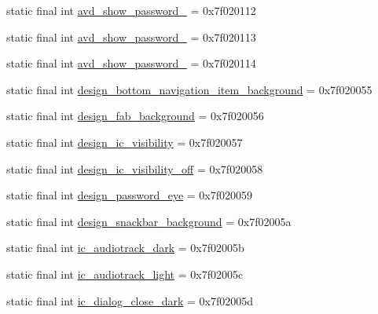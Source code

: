 \begin{CompactItemize}
\item 
static final int \hyperlink{classandroid_1_1support_1_1graphics_1_1drawable_1_1_r_1_1drawable_d4a29aeaf7ad557cc3f14b1596bc7652}{avd\_\-show\_\-password\_} = 0x7f020112
\item 
static final int \hyperlink{classandroid_1_1support_1_1graphics_1_1drawable_1_1_r_1_1drawable_0d20597e86bdadbb3573130cd3dee97e}{avd\_\-show\_\-password\_} = 0x7f020113
\item 
static final int \hyperlink{classandroid_1_1support_1_1graphics_1_1drawable_1_1_r_1_1drawable_2eb027e16dbe509fb7a4896f383d34ef}{avd\_\-show\_\-password\_} = 0x7f020114
\item 
static final int \hyperlink{classandroid_1_1support_1_1graphics_1_1drawable_1_1_r_1_1drawable_e15c27d54b049f78090d451ca2348e3a}{design\_\-bottom\_\-navigation\_\-item\_\-background} = 0x7f020055
\item 
static final int \hyperlink{classandroid_1_1support_1_1graphics_1_1drawable_1_1_r_1_1drawable_ea99f949fddb1cf339265057a4a5ef2c}{design\_\-fab\_\-background} = 0x7f020056
\item 
static final int \hyperlink{classandroid_1_1support_1_1graphics_1_1drawable_1_1_r_1_1drawable_ede647d858c86def0e6b942018263dd7}{design\_\-ic\_\-visibility} = 0x7f020057
\item 
static final int \hyperlink{classandroid_1_1support_1_1graphics_1_1drawable_1_1_r_1_1drawable_0a183279136f47d7c36b6ddb45dff171}{design\_\-ic\_\-visibility\_\-off} = 0x7f020058
\item 
static final int \hyperlink{classandroid_1_1support_1_1graphics_1_1drawable_1_1_r_1_1drawable_01623208452ba23558096606a51e0fa6}{design\_\-password\_\-eye} = 0x7f020059
\item 
static final int \hyperlink{classandroid_1_1support_1_1graphics_1_1drawable_1_1_r_1_1drawable_bc4f9fa0b74e1fc1dcbd5b5541974fe8}{design\_\-snackbar\_\-background} = 0x7f02005a
\item 
static final int \hyperlink{classandroid_1_1support_1_1graphics_1_1drawable_1_1_r_1_1drawable_e607e4c96c05dad67e7792f95d184d05}{ic\_\-audiotrack\_\-dark} = 0x7f02005b
\item 
static final int \hyperlink{classandroid_1_1support_1_1graphics_1_1drawable_1_1_r_1_1drawable_c07ec90c8ffd99807fe6835dacb41b35}{ic\_\-audiotrack\_\-light} = 0x7f02005c
\item 
static final int \hyperlink{classandroid_1_1support_1_1graphics_1_1drawable_1_1_r_1_1drawable_b43d2130fe6a4a26f3e776b2ce438a34}{ic\_\-dialog\_\-close\_\-dark} = 0x7f02005d

\end{CompactItemize}
